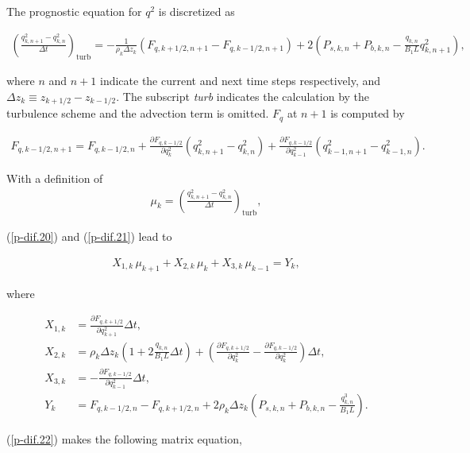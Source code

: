 The prognostic equation for \(q^2\) is discretized as

\begin{eqnarray} \left(\frac{q^2_{k,n+1}-q^2_{k,n}}{\Delta t}\right)_{\text{turb}} = -\frac{1}{\rho_k\Delta z_k}\left(F_{q,k+1/2,n+1}-F_{q,k-1/2,n+1}\right) +2\left( P_{s,k,n} + P_{b,k,n} - \frac{q_{k,n}}{B_1L}q^2_{k,n+1}\right), \label{p-dif.20} \end{eqnarray}

where \(n\) and \(n+1\) indicate the current and next time steps
respectively, and \(\Delta z_k \equiv z_{k+1/2}-z_{k-1/2}\). The
subscript \emph{turb} indicates the calculation by the turbulence scheme
and the advection term is omitted. \(F_q\) at \(n+1\) is computed by

\begin{eqnarray} F_{q,k-1/2,n+1} = F_{q,k-1/2,n} + \frac{\partial F_{q,k-1/2}}{\partial q^2_k}(q^2_{k,n+1}-q^2_{k,n}) +  \frac{\partial F_{q,k-1/2}}{\partial q^2_{k-1}}(q^2_{k-1,n+1}-q^2_{k-1,n}). \label{p-dif.21} \end{eqnarray}

With a definition of
\begin{eqnarray}\mu_k = \left(\frac{q^2_{k,n+1}-q^2_{k,n}}{\Delta t}\right)_{\text{turb}},\end{eqnarray}

(\ref{p-dif.20}) and (\ref{p-dif.21}) lead to

\begin{eqnarray}
 X_{1,k}\,\mu_{k+1}+X_{2,k}\,\mu_k+X_{3,k}\,\mu_{k-1} = Y_k, \label{p-dif.22}
\end{eqnarray}

where

\begin{align}
 X_{1,k} &= \frac{\partial F_{q,k+1/2}}{\partial q^2_{k+1}} \Delta t, \\
 X_{2,k} &= \rho_k \Delta z_k \left(1+2\frac{q_{k,n}}{B_1 L}\Delta t \right) + \left( \frac{\partial F_{q,k+1/2}}{\partial q^2_k} - \frac{\partial F_{q,k-1/2}}{\partial q^2_k} \right)\Delta t, \\
 X_{3,k} &= -\frac{\partial F_{q,k-1/2}}{\partial q^2_{k-1}} \Delta t, \\
 Y_k &= F_{q,k-1/2,n} - F_{q,k+1/2,n} + 2\rho_k \Delta z_k \left( P_{s,k,n} + P_{b,k,n} - \frac{q^3_{k,n}}{B_1 L} \right).
\end{align}

(\ref{p-dif.22}) makes the following matrix equation,

